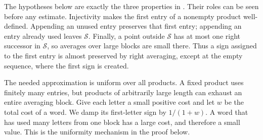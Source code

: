 \documentclass[11pt,letterpaper]{amsart}
\theoremstyle{definition}
\theoremstyle{remark}
\begin{document}
The hypotheses below are exactly the three properties in
\cite[Example~5.5, Claim~1]{DD}. Their roles can be seen before any
estimate. Injectivity makes the first entry of a nonempty product
well-defined. Appending an unused entry preserves that first entry;
appending an entry already used leaves $\mathcal S$. Finally, a point
outside $\mathcal S$ has at most one right successor in $\mathcal S$,
so averages over large blocks are small there. Thus a sign assigned to
the first entry is almost preserved by right averaging, except at the
empty sequence, where the first sign is created.

The needed approximation is uniform over all products. A fixed product
uses finitely many entries, but products of arbitrarily large length
can exhaust an entire averaging block. Give each letter a small
positive cost and let $w$ be the total cost of a word. We damp its
first-letter sign by $1/(1+w)$. A word that has used many letters from
one block has a large cost, and therefore a small value. This is the
uniformity mechanism in the proof below.
\end{document}
